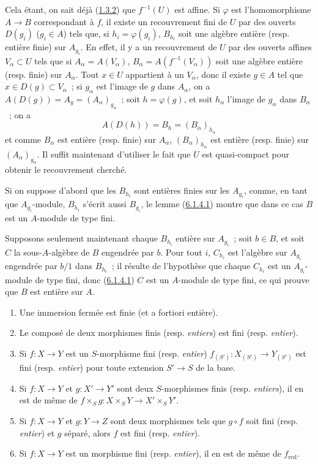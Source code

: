 Cela étant, on sait déjà (\hyperref[II.1.3.2-fr]{1.3.2}) que $f^{-1}(U)$ est
affine. Si $\varphi$ est l'homomorphisme $A\to B$ correspondant à $f$, il
existe un recouvrement fini de $U$ par des ouverts $D(g_i)$ ($g_i\in A$) tels
que, si $h_i=\varphi(g_i)$, $B_{h_i}$ soit une algèbre entière (resp. entière
finie) sur $A_{g_i}$. En effet, il y a un recouvrement de $U$ par des ouverts
affines $V_\alpha\subset U$ tels que si
$A_\alpha=A(V_\alpha)$, $B_\alpha=A(f^{-1}(V_\alpha))$ soit une algèbre
entière (resp. finie) sur $A_\alpha$. Tout $x\in U$ appartient à un
$V_\alpha$, donc il existe $g\in A$ tel que $x\in D(g)\subset V_\alpha$~; si
$g_\alpha$ est l'image de $g$ dans $A_\alpha$, on a
$A(D(g))=A_g=(A_\alpha)_{g_\alpha}$~; soit $h=\varphi(g)$, et soit $h_\alpha$
l'image de $g_\alpha$ dans $B_\alpha$~; on a
\[
A(D(h))=B_h=(B_\alpha)_{h_\alpha}
\]
et comme $B_\alpha$ est entière (resp. finie) sur $A_\alpha$,
$(B_\alpha)_{h_\alpha}$ est entière (resp. finie) sur
$(A_\alpha)_{g_\alpha}$. Il suffit maintenant d'utiliser le fait que $U$ est
quasi-compact pour obtenir le recouvrement cherché.

Si on suppose d'abord que les $B_{h_i}$ sont entières finies sur les
$A_{g_i}$, comme, en tant que $A_{g_i}$-module, $B_{h_i}$ s'écrit aussi
$B_{g_i}$, le lemme (\hyperref[II.6.1.4.1-fr]{6.1.4.1}) montre que dans ce cas
$B$ est un $A$-module de type fini.

Supposons seulement maintenant chaque $B_{h_i}$ entière sur $A_{g_i}$~; soit
$b\in B$, et soit $C$ la sous-$A$-algèbre de $B$ engendrée par $b$. Pour tout
$i$, $C_{h_i}$ est l'algèbre sur $A_{g_i}$ engendrée par $b/1$ dans
$B_{h_i}$~; il résulte de l'hypothèse que chaque $C_{h_i}$ est un
$A_{g_i}$-module de type fini, donc
(\hyperref[II.6.1.4.1-fr]{6.1.4.1}) $C$ est un $A$-module de type fini, ce qui
prouve que $B$ est entière sur $A$.

\begin{proposition}[6.1.5]
\label{II.6.1.5-fr}
\begin{enumerate}
\item[\textup{(i)}] Une immersion fermée est finie (et \textup{a fortiori} entière).
\item[\textup{(ii)}] Le composé de deux morphismes finis \textup{(resp. \emph{entiers})} est fini
\textup{(resp. \emph{entier})}.
\item[\textup{(iii)}] Si $f:X\to Y$ est un $S$-morphisme fini \textup{(resp. \emph{entier})}
$f_{(S')}:X_{(S')}\to Y_{(S')}$ est fini \textup{(resp. \emph{entier})} pour toute extension
$S'\to S$ de la base.
\item[\textup{(iv)}] Si $f:X\to Y$ et $g:X'\to Y'$ sont deux $S$-morphismes finis
\textup{(resp. \emph{entiers})}, il en est de même de
$f\times_S g:X\times_S Y\to X'\times_S Y'$.
\item[\textup{(v)}] Si $f:X\to Y$ et $g:Y\to Z$ sont deux morphismes tels que $g\circ
f$ soit fini \textup{(resp. \emph{entier})} et $g$ séparé, alors $f$ est fini \textup{(resp. \emph{entier})}.
\item[\textup{(vi)}] Si $f:X\to Y$ est un morphisme fini \textup{(resp. \emph{entier})}, il en est de
même de $f_{\mathrm{red}}$.
\end{enumerate}
\end{proposition}

